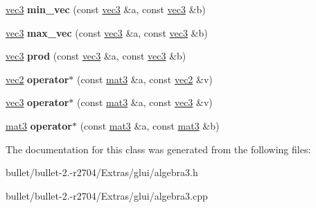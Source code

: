 \begin{DoxyCompactItemize}
\item 
\hypertarget{classvec3_a6e9f78953f1d63ec8cee3fb16b828cc8}{\hyperlink{classvec3}{vec3} {\bfseries min\+\_\+vec} (const \hyperlink{classvec3}{vec3} \&a, const \hyperlink{classvec3}{vec3} \&b)}\label{classvec3_a6e9f78953f1d63ec8cee3fb16b828cc8}

\item 
\hypertarget{classvec3_a6b61534e725e4a5fea030d02daa3d43a}{\hyperlink{classvec3}{vec3} {\bfseries max\+\_\+vec} (const \hyperlink{classvec3}{vec3} \&a, const \hyperlink{classvec3}{vec3} \&b)}\label{classvec3_a6b61534e725e4a5fea030d02daa3d43a}

\item 
\hypertarget{classvec3_aa4e6ac89db67a3ca3f78380dac421502}{\hyperlink{classvec3}{vec3} {\bfseries prod} (const \hyperlink{classvec3}{vec3} \&a, const \hyperlink{classvec3}{vec3} \&b)}\label{classvec3_aa4e6ac89db67a3ca3f78380dac421502}

\item 
\hypertarget{classvec3_a307ae299187b6d9e75b1a7730b6213c2}{\hyperlink{classvec2}{vec2} {\bfseries operator$\ast$} (const \hyperlink{classmat3}{mat3} \&a, const \hyperlink{classvec2}{vec2} \&v)}\label{classvec3_a307ae299187b6d9e75b1a7730b6213c2}

\item 
\hypertarget{classvec3_a46bbeb7eed270ad69b34c3a1b93eb050}{\hyperlink{classvec3}{vec3} {\bfseries operator$\ast$} (const \hyperlink{classmat3}{mat3} \&a, const \hyperlink{classvec3}{vec3} \&v)}\label{classvec3_a46bbeb7eed270ad69b34c3a1b93eb050}

\item 
\hypertarget{classvec3_a0df0a7a0901cee5daec15003ee3594fc}{\hyperlink{classmat3}{mat3} {\bfseries operator$\ast$} (const \hyperlink{classmat3}{mat3} \&a, const \hyperlink{classmat3}{mat3} \&b)}\label{classvec3_a0df0a7a0901cee5daec15003ee3594fc}

\end{DoxyCompactItemize}


The documentation for this class was generated from the following files\+:\begin{DoxyCompactItemize}
\item 
bullet/bullet-\/2.-\/r2704/\+Extras/glui/algebra3.\+h\item 
bullet/bullet-\/2.-\/r2704/\+Extras/glui/algebra3.\+cpp\end{DoxyCompactItemize}
